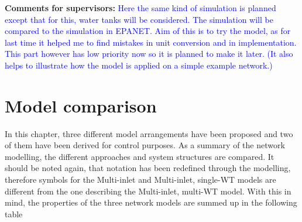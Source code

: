 \textbf{Comments for supervisors:}
\newline
\textcolor{blue}{Here the same kind of simulation is planned except that for this, water tanks will be considered. The simulation will be compared to the simulation in EPANET. Aim of this is to try the model, as for last time it helped me to find mistakes in unit conversion and in implementation. This part however has low priority now so it is planned to make it later. (It also helps to illustrate how the model is applied on a simple example network.)}

\newpage

\section{Model comparison}
\label{model_comparison}

In this chapter, three different model arrangements have been proposed and two of them have been derived for control purposes. As a summary of the network modelling, the different approaches and system structures are compared. It should be noted again, that notation has been redefined through the modelling, therefore symbols for the Multi-inlet and Multi-inlet, single-WT models are different from the one describing the Multi-inlet, multi-WT model. With this in mind, the properties of the three network models are summed up in the following table

